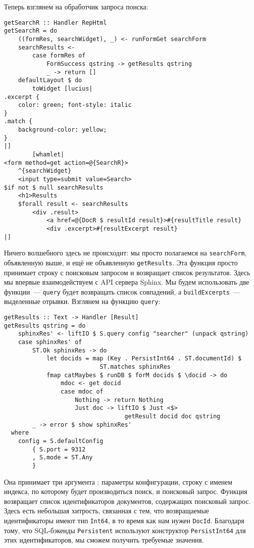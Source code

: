 Теперь взглянем на обработчик запроса поиска: %

\begin{lstlisting}
getSearchR :: Handler RepHtml
getSearchR = do
    ((formRes, searchWidget), _) <- runFormGet searchForm
    searchResults <-
        case formRes of
            FormSuccess qstring -> getResults qstring
            _ -> return []
    defaultLayout $ do
        toWidget [lucius|
.excerpt {
    color: green; font-style: italic
}
.match {
    background-color: yellow;
}
|]
        [whamlet|
<form method=get action=@{SearchR}>
    ^{searchWidget}
    <input type=submit value=Search>
$if not $ null searchResults
    <h1>Results
    $forall result <- searchResults
        <div .result>
            <a href=@{DocR $ resultId result}>#{resultTitle result}
            <div .excerpt>#{resultExcerpt result}
|]
\end{lstlisting}%

Ничего волшебного здесь не происходит: мы просто полагаемся на \lstinline'searchForm', объявленную выше, и ещё не объявленную \lstinline'getResults'. Эта функция просто принимает строку с поисковым запросом и возвращает список результатов. Здесь мы впервые взаимодействуем с API сервера Sphinx. Мы будем использовать две функции~--- \lstinline'query' будет возвращать список совпадений, а \lstinline'buildExcerpts'~--- выделенные отрывки. Взглянем на функцию \lstinline!query!:

\begin{lstlisting}
getResults :: Text -> Handler [Result]
getResults qstring = do
    sphinxRes' <- liftIO $ S.query config "searcher" (unpack qstring)
    case sphinxRes' of
        ST.Ok sphinxRes -> do
            let docids = map (Key . PersistInt64 . ST.documentId) $
                           ST.matches sphinxRes
            fmap catMaybes $ runDB $ forM docids $ \docid -> do
                mdoc <- get docid
                case mdoc of
                    Nothing -> return Nothing
                    Just doc -> liftIO $ Just <$>
                                  getResult docid doc qstring
        _ -> error $ show sphinxRes'
  where
    config = S.defaultConfig
        { S.port = 9312
        , S.mode = ST.Any
        }
\end{lstlisting}%

Она принимает три аргумента : параметры конфигурации, строку с именем индекса, по которому будет производиться поиск, и поисковый запрос. Функция возвращает список идентификаторов документов, содержащих поисковый запрос. Здесь есть небольшая хитрость, связанная с тем, что возвращаемые идентификаторы имеют тип \lstinline'Int64', в то время как нам нужен \lstinline'DocId'. Благодаря тому, что SQL-бэкенды \lstinline'Persistent' используют конструктор \lstinline'PersistInt64' для этих идентификаторов, мы сможем получить требуемые значения.

